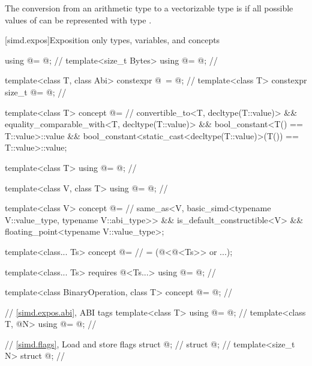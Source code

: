 \pnum
The conversion from an arithmetic type  to a vectorizable type  is
 if
all possible values of  can be represented with type .

[simd.expos]{Exposition only types, variables, and concepts}

\begin{codeblock}
using @\simdsizetype@ = @\seebelow@;                                 // \expos
template<size_t Bytes> using @\integerfrom@ = @\seebelow@;            // \expos

template<class T, class Abi>
  constexpr @\simdsizetype\ \simdsizev@ = @\seebelow@;               // \expos
template<class T> constexpr size_t @\maskelementsize@ = @\seebelow@; // \expos

template<class T>
  concept @\constexprwrapperlike@ =                                // \expos
    convertible_to<T, decltype(T::value)> &&
    equality_comparable_with<T, decltype(T::value)> &&
    bool_constant<T() == T::value>::value &&
    bool_constant<static_cast<decltype(T::value)>(T()) == T::value>::value;

template<class T> using @\deducedsimd@ = @\seebelow@;               // \expos

template<class V, class T> using @\makecompatiblesimdt@ = @\seebelow@; // \expos

template<class V>
  concept @\simdfloatingpoint@ =                                   // \expos
    same_as<V, basic_simd<typename V::value_type, typename V::abi_type>> &&
    is_default_constructible<V> && floating_point<typename V::value_type>;

template<class... Ts>
  concept @\mathfloatingpoint@ =                                   // \expos
    = (@\simdfloatingpoint@<@\deducedsimd@<Ts>> or ...);

template<class... Ts>
  requires @\mathfloatingpoint@<Ts...>
    using @\mathcommonsimd@ = @\seebelow@;                         // \expos

template<class BinaryOperation, class T>
  concept @\reductionoperation@ = @\seebelow@;                     // \expos

// \ref{simd.expos.abi},  ABI tags
template<class T> using @\nativeabi@ = @\seebelow@;                   // \expos
template<class T, @\simdsizetype@ N> using @\deducet@ = @\seebelow@;   // \expos

// \ref{simd.flags}, Load and store flags
struct @\convertflag@;                                              // \expos
struct @\alignedflag@;                                              // \expos
template<size_t N> struct @\overalignedflag@;                       // \expos
\end{codeblock}


